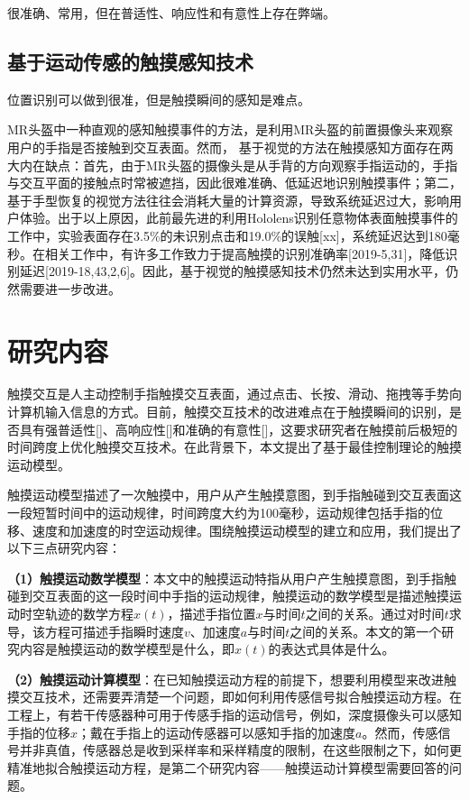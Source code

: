 很准确、常用，但在普适性、响应性和有意性上存在弊端。

\subsection{基于运动传感的触摸感知技术}

位置识别可以做到很准，但是触摸瞬间的感知是难点。

MR头盔中一种直观的感知触摸事件的方法，是利用MR头盔的前置摄像头来观察用户的手指是否接触到交互表面。然而， 基于视觉的方法在触摸感知方面存在两大内在缺点：首先，由于MR头盔的摄像头是从手背的方向观察手指运动的，手指与交互平面的接触点时常被遮挡，因此很难准确、低延迟地识别触摸事件；第二，基于手型恢复的视觉方法往往会消耗大量的计算资源，导致系统延迟过大，影响用户体验。出于以上原因，此前最先进的利用Hololens识别任意物体表面触摸事件的工作中，实验表面存在3.5\%的未识别点击和19.0\%的误触[xx]，系统延迟达到180毫秒。在相关工作中，有许多工作致力于提高触摸的识别准确率[2019-5,31]，降低识别延迟[2019-18,43,2,6]。因此，基于视觉的触摸感知技术仍然未达到实用水平，仍然需要进一步改进。

\section{研究内容}

触摸交互是人主动控制手指触摸交互表面，通过点击、长按、滑动、拖拽等手势向计算机输入信息的方式。目前，触摸交互技术的改进难点在于触摸瞬间的识别，是否具有强普适性[]、高响应性[]和准确的有意性[]，这要求研究者在触摸前后极短的时间跨度上优化触摸交互技术。在此背景下，本文提出了基于最佳控制理论的触摸运动模型。

触摸运动模型描述了一次触摸中，用户从产生触摸意图，到手指触碰到交互表面这一段短暂时间中的运动规律，时间跨度大约为100毫秒，运动规律包括手指的位移、速度和加速度的时空运动规律。围绕触摸运动模型的建立和应用，我们提出了以下三点研究内容：

\textbf{（1）触摸运动数学模型}：本文中的触摸运动特指从用户产生触摸意图，到手指触碰到交互表面的这一段时间中手指的运动规律，触摸运动的数学模型是描述触摸运动时空轨迹的数学方程$x(t)$，描述手指位置$x$与时间$t$之间的关系。通过对时间$t$求导，该方程可描述手指瞬时速度$v$、加速度$a$与时间$t$之间的关系。本文的第一个研究内容是触摸运动的数学模型是什么，即$x(t)$的表达式具体是什么。

\textbf{（2）触摸运动计算模型}：在已知触摸运动方程的前提下，想要利用模型来改进触摸交互技术，还需要弄清楚一个问题，即如何利用传感信号拟合触摸运动方程。在工程上，有若干传感器种可用于传感手指的运动信号，例如，深度摄像头可以感知手指的位移$x$；戴在手指上的运动传感器可以感知手指的加速度$a$。然而，传感信号并非真值，传感器总是收到采样率和采样精度的限制，在这些限制之下，如何更精准地拟合触摸运动方程，是第二个研究内容——触摸运动计算模型需要回答的问题。

